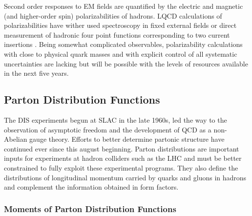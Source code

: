 Second order responses to EM fields are quantified by the electric and magnetic (and higher-order spin) polarizabilities of hadrons. LQCD calculations of polarizabilities have wither used spectroscopy in fixed external fields \cite{} or direct measurement of hadronic four point functions corresponding to two current insertions \cite{}. Being somewhat complicated observables, polarizability calculations with close to physical quark masses and with explicit control of all systematic uncertainties are lacking but will be possible with the levels of resources available in the next five years.

\subsection{Parton Distribution Functions}



The DIS experiments begun at SLAC in the late 1960s, led the way to the observation of asymptotic freedom and the development of QCD as a non-Abelian gauge theory. Efforts to better determine partonic structure have continued ever since this august beginning. Parton distributions are important inputs for experiments at hadron colliders such as the LHC and must be better constrained to fully exploit these experimental programs. They also define the distributions of longitudinal momentum carried by quarks and gluons in hadrons and complement the information obtained in form factors.


\subsubsection{Moments of Parton Distribution Functions}


